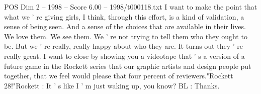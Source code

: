\begin{textsample}{POS Dim 2 – 1998 – Score 6.00 – 1998/t000118.txt}
I want to make the point that what we ' re giving girls, I think, through this effort, is a kind of validation, a sense of being seen.
And a sense of the choices that are available in their lives.
We love them.
We see them.
We ' re not trying to tell them who they ought to be.
But we ' re really, really happy about who they are.
It turns out they ' re really great.
I want to close by showing you a videotape that ' s a version of a future game in the Rockett series that our graphic artists and design people put together, that we feel would please that four percent of reviewers."Rockett 28!"Rockett : It ' s like I ' m just waking up, you know?
BL : Thanks.

\end{textsample}
